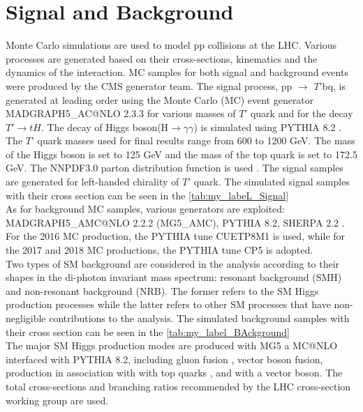 \chapter{\label{signal_background}Signal and Background}


Monte Carlo simulations are used to model pp collisions at the LHC. Various processes are generated based on their cross-sections, kinematics and the dynamics of the interaction. MC samples for both signal and background events were produced by the CMS generator team. 
The signal process, pp $\longrightarrow$ $T{’}$bq, is generated at leading order using the Monte Carlo (MC) event generator MADGRAPH5\_AC@NLO 2.3.3 \cite{Alwall2014, Artoisenet2013}for various masses of $T{’}$ quark and for the decay $T'\longrightarrow tH$. The decay of Higgs boson(H$\longrightarrow \gamma \gamma$) is simulated using PYTHIA 8.2 \cite{SJOSTRAND2015159}. The $T{’}$ quark masses used for final results range from 600 to 1200 GeV. The mass of the Higgs boson is set to 125 GeV and the mass of the top quark is set to 172.5 GeV. The NNPDF3.0 parton distribution function is used \cite{Ball_2015} . The signal samples are generated for left-handed chirality of $T{’}$ quark. The simulated signal samples with their cross section can be seen in the \autoref{tab:my_labeL_Signal} \\
As for background MC samples, various generators are exploited: MADGRAPH5\_AMC@NLO 2.2.2 (MG5\_AMC), PYTHIA 8.2\cite{SJOSTRAND2015159}, SHERPA 2.2 \cite{10.21468/SciPostPhys.7.3.034}. For the 2016 MC production, the PYTHIA tune CUETP8M1 \cite{Khachatryan2016} is used, while for the 2017 and 2018 MC productions, the PYTHIA tune CP5 \cite{Sirunyan2020} is adopted. \\
Two types of SM background are considered in the analysis according to their shapes in the di-photon invariant mass spectrum: resonant background (SMH) and non-resonant background (NRB). The former refers to the SM Higgs production processes while the latter refers to other SM processes that have non-negligible contributions to the analysis. The simulated background samples with their cross section can be seen in the \autoref{tab:my_label_BAckground}\\
The major SM Higgs production modes are produced with MG5 a MC@NLO interfaced with PYTHIA 8.2, including gluon fusion \cite{Bagnaschi_2012}, vector boson fusion, production in association with with top quarks \cite{PhysRevD.91.094003}, and with a vector boson. The total cross-sections and branching ratios recommended by the LHC cross-section working group  are used.

